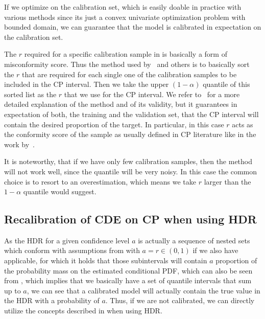 If we optimize  on the calibration set, which is easily doable in practice with various methods since its just a convex univariate optimization problem with bounded domain, we can guarantee that the model is calibrated in expectation on the calibration set.

The $r$ required for a specific calibration sample in  is basically a form of misconformity score. Thus the method used by~\cite{sesia2021conformal, chernozhukov2021distributional} and others is to basically sort the $r$ that are required for each single one of the calibration samples to be included in the CP interval. Then we take the upper $(1- \alpha)$ quantile of this sorted list as the $r$ that we use for the CP interval. We refer to~\cite{sesia2021conformal} for a more detailed explanation of the method and of its validity, but it guarantees in expectation of both, the training and the validation set, that the CP interval will contain the desired proportion of the target. In particular, in this case $r$ acts as the conformity score of the sample as usually defined in CP literature like in the work by~\cite{sesia2021conformal}.

It is noteworthy, that if we have only few calibration samples, then the method will not work well, since the quantile will be very noisy. In this case the common choice is to resort to an overestimation, which means we take $r$ larger than the $1-\alpha$ quantile would suggest.

\subsection{Recalibration of CDE on CP when using HDR}\label{sec:cp_sub_cde_hrd}

As the HDR for a given confidence level $a$ is actually a sequence of nested sets which conform with assumptions from  with $a = r \in (0,1)$ if we also have  applicable, for which it holds that those subintervals will contain $a$ proportion of the probability mass on the estimated conditional PDF, which can also be seen from , which implies that we basically have a set of quantile intervals that sum up to $a$, we can see that a calibrated model will actually contain the true value in the HDR with a probability of $a$. Thus, if we are not calibrated, we can directly utilize the concepts described in  when using HDR.\@

